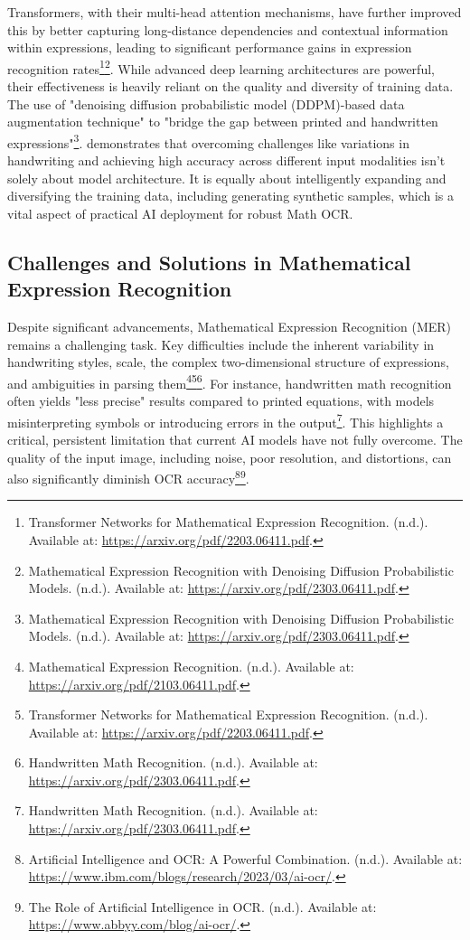 Transformers, with their multi-head attention mechanisms, have further improved this by better capturing long-distance dependencies and contextual information within expressions, leading to significant performance gains in expression recognition rates\footnote{Transformer Networks for Mathematical Expression Recognition. (n.d.). Available at: \url{https://arxiv.org/pdf/2203.06411.pdf}.}\footnote{Mathematical Expression Recognition with Denoising Diffusion Probabilistic Models. (n.d.). Available at: \url{https://arxiv.org/pdf/2303.06411.pdf}.}. While advanced deep learning architectures are powerful, their effectiveness is heavily reliant on the quality and diversity of training data. The use of "denoising diffusion probabilistic model (DDPM)-based data augmentation technique" to "bridge the gap between printed and handwritten expressions"\footnote{Mathematical Expression Recognition with Denoising Diffusion Probabilistic Models. (n.d.). Available at: \url{https://arxiv.org/pdf/2303.06411.pdf}.}. demonstrates that overcoming challenges like variations in handwriting and achieving high accuracy across different input modalities isn't solely about model architecture. It is equally about intelligently expanding and diversifying the training data, including generating synthetic samples, which is a vital aspect of practical AI deployment for robust Math OCR.

\subsection{Challenges and Solutions in Mathematical Expression Recognition}
Despite significant advancements, Mathematical Expression Recognition (MER) remains a challenging task. Key difficulties include the inherent variability in handwriting styles, scale, the complex two-dimensional structure of expressions, and ambiguities in parsing them\footnote{Mathematical Expression Recognition. (n.d.). Available at: \url{https://arxiv.org/pdf/2103.06411.pdf}.}\footnote{Transformer Networks for Mathematical Expression Recognition. (n.d.). Available at: \url{https://arxiv.org/pdf/2203.06411.pdf}.}\footnote{Handwritten Math Recognition. (n.d.). Available at: \url{https://arxiv.org/pdf/2303.06411.pdf}.}. For instance, handwritten math recognition often yields "less precise" results compared to printed equations, with models misinterpreting symbols or introducing errors in the output\footnote{Handwritten Math Recognition. (n.d.). Available at: \url{https://arxiv.org/pdf/2303.06411.pdf}.}. This highlights a critical, persistent limitation that current AI models have not fully overcome. The quality of the input image, including noise, poor resolution, and distortions, can also significantly diminish OCR accuracy\footnote{Artificial Intelligence and OCR: A Powerful Combination. (n.d.). Available at: \url{https://www.ibm.com/blogs/research/2023/03/ai-ocr/}.}\footnote{The Role of Artificial Intelligence in OCR. (n.d.). Available at: \url{https://www.abbyy.com/blog/ai-ocr/}.}.

